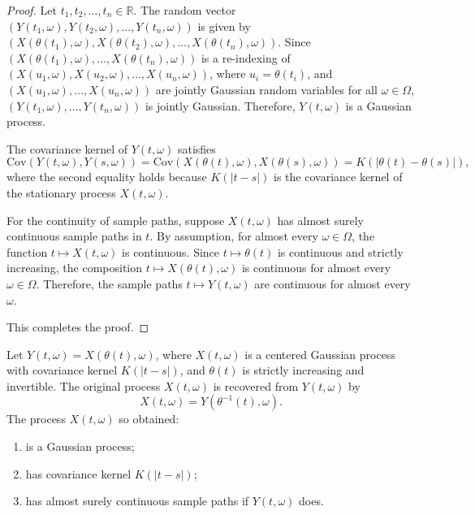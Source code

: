 \documentclass{mc}
\begin{document}
\begin{proof}
Let \(t_1, t_2, \dots, t_n \in \mathbb{R}\). The random vector \((Y(t_1, \omega), Y(t_2, \omega), \dots, Y(t_n, \omega))\) is given by \((X(\theta(t_1), \omega), X(\theta(t_2), \omega), \dots, X(\theta(t_n), \omega))\). Since \((X(\theta(t_1), \omega), \dots, X(\theta(t_n), \omega))\) is a re-indexing of \((X(u_1, \omega), X(u_2, \omega), \dots, X(u_n, \omega))\), where \(u_i = \theta(t_i)\), and \((X(u_1, \omega), \dots, X(u_n, \omega))\) are jointly Gaussian random variables for all \(\omega \in \Omega\), \((Y(t_1,\omega), \dots, Y(t_n,\omega))\) is jointly Gaussian. Therefore, \(Y(t, \omega)\) is a Gaussian process.

The covariance kernel of \(Y(t, \omega)\) satisfies
\[
\mathrm{Cov}(Y(t, \omega), Y(s, \omega)) = \mathrm{Cov}(X(\theta(t), \omega), X(\theta(s), \omega)) = K(|\theta(t) - \theta(s)|),
\]
where the second equality holds because \(K(|t-s|)\) is the covariance kernel of the stationary process \(X(t, \omega)\).

For the continuity of sample paths, suppose \(X(t, \omega)\) has almost surely continuous sample paths in \(t\). By assumption, for almost every \(\omega \in \Omega\), the function \(t \mapsto X(t, \omega)\) is continuous. Since \(t \mapsto \theta(t)\) is continuous and strictly increasing, the composition \(t \mapsto X(\theta(t), \omega)\) is continuous for almost every \(\omega \in \Omega\). Therefore, the sample paths \(t \mapsto Y(t,\omega)\) are continuous for almost every \(\omega\).

This completes the proof.
\end{proof}

\begin{theorem}
Let \(Y(t, \omega) = X(\theta(t), \omega)\), where \(X(t, \omega)\) is a centered Gaussian process with covariance kernel \(K(|t - s|)\), and \(\theta(t)\) is strictly increasing and invertible. The original process \(X(t, \omega)\) is recovered from \(Y(t, \omega)\) by
\[
X(t, \omega) = Y(\theta^{-1}(t), \omega).
\]
The process \(X(t, \omega)\) so obtained:
\begin{enumerate}
    \item is a Gaussian process;
    \item has covariance kernel \(K(|t-s|)\);
    \item has almost surely continuous sample paths if \(Y(t, \omega)\) does.
\end{enumerate}
\end{theorem}
\end{document}
